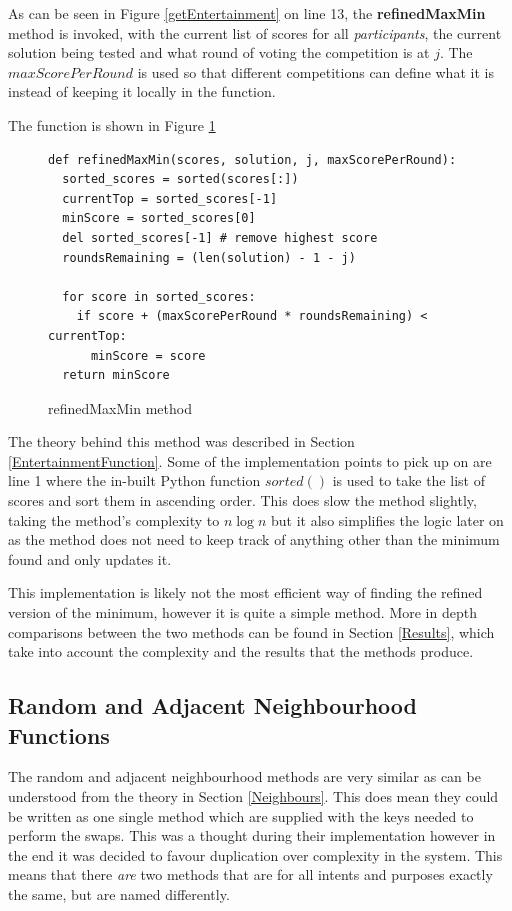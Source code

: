 \documentclass[12pt]{report}
\begin{document}
As can be seen in Figure \ref{getEntertainment} on line 13, the \textbf{refinedMaxMin} method is invoked, with the current list of scores for all \textit{participants}, the current solution being tested and what round of voting the competition is at $j$. The $maxScorePerRound$ is used so that different competitions can define what it is instead of keeping it locally in the function.

The function is shown in Figure \ref{refMaxMin}

\begin{figure}[H]
\caption{refinedMaxMin method}
\label{refMaxMin}
\begin{lstlisting}
def refinedMaxMin(scores, solution, j, maxScorePerRound):
  sorted_scores = sorted(scores[:])
  currentTop = sorted_scores[-1]
  minScore = sorted_scores[0]
  del sorted_scores[-1] # remove highest score
  roundsRemaining = (len(solution) - 1 - j)

  for score in sorted_scores:
    if score + (maxScorePerRound * roundsRemaining) < currentTop:
      minScore = score
  return minScore
\end{lstlisting}
\end{figure}

The theory behind this method was described in Section \ref{EntertainmentFunction}. Some of the implementation points to pick up on are line 1 where the in-built Python function $sorted()$\cite{PythonSorted} is used to take the list of scores and sort them in ascending order. This does slow the method slightly, taking the method's complexity to $n \log n$ but it also simplifies the logic later on as the method does not need to keep track of anything other than the minimum found and only updates it.

This implementation is likely not the most efficient way of finding the refined version of the minimum, however it is quite a simple method. More in depth comparisons between the two methods can be found in Section \ref{Results}, which take into account the complexity and the results that the methods produce.

\subsection{Random and Adjacent Neighbourhood Functions}\label{Imp-Neighbours}
The random and adjacent neighbourhood methods are very similar as can be understood from the theory in Section \ref{Neighbours}. This does mean they could be written as one single method which are supplied with the keys needed to perform the swaps. This was a thought during their implementation however in the end it was decided to favour duplication over complexity in the system. This means that there \textit{are} two methods that are for all intents and purposes exactly the same, but are named differently.
\end{document}
